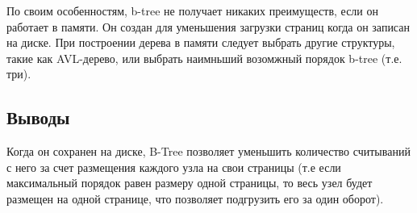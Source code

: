 \documentclass[12pt]{article}
\begin{document}
По своим особенностям, b-tree не получает никаких преимуществ, если он работает в памяти. Он создан для уменьшения загрузки страниц когда он записан на диске. При построении дерева в памяти следует выбрать другие структуры, такие как AVL-дерево, или выбрать наимньший возомжный порядок b-tree (т.е. три).

\subsection*{Выводы}

Когда он сохранен на диске, B-Tree позволяет уменьшить количество считываний с него за счет размещения каждого узла на свои страницы (т.е если максимальный порядок равен размеру одной страницы, то весь узел будет размещен на одной странице, что позволяет подгрузить его за один оборот).
\end{document}
